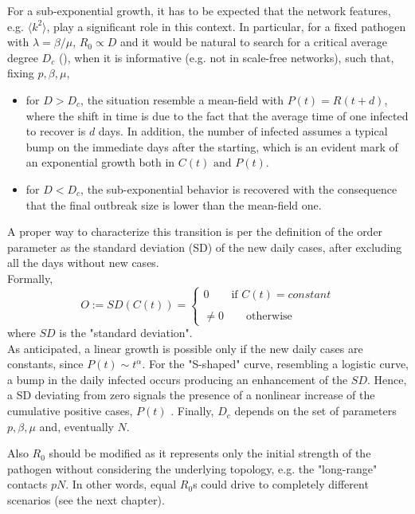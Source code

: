 \documentclass[a4paper,10pt,twoside]{book} %
\theoremstyle{definition}
\begin{document}
For a sub-exponential growth, it has to be expected that the network features, e.g. $\langle k^2 \rangle$, play a significant role in this context. In particular, for a fixed pathogen with $\lambda = \beta/ \mu$, $R_0 \propto D$ and it would be natural to search for a critical average degree $D_c$ (\cite{Thurner::NetBasedExpl}), when it is informative (e.g. not in scale-free networks), such that, fixing $p, \beta, \mu$, 
\begin{itemize}
	\item for $D>D_c$, the situation resemble a mean-field with $P(t) = R(t+d)$, where the shift in time is due to the fact that the average time of one infected to recover is $d$ days. In addition, the number of infected assumes a typical bump on the immediate days after the starting, which is an evident mark of an exponential growth both in $C(t) \text{ and } P(t)$.
	\item for $D<D_c$, the sub-exponential behavior is recovered with the consequence that the final outbreak size is lower than the mean-field one.
\end{itemize}
A proper way to characterize this transition is per the definition of the order parameter \cite{Thurner::NetBasedExpl} as the standard deviation (SD) of the new daily cases, after excluding all the days without new cases.
\\Formally,
\begin{equation}
	O := SD(C(t)) = 
	\begin{cases}
		0 \qquad \text{if $C(t) = constant$}\\\\
		\neq 0 \qquad \text{otherwise} 
	\end{cases}
\end{equation}
where $SD$ is the "standard deviation".
\\As anticipated, a linear growth is possible only if the new daily cases are constants, since $P(t) \sim t^{\alpha}$. For the "S-shaped" curve, resembling a logistic curve, a bump in the daily infected occurs producing an enhancement of the $SD$. Hence, a SD deviating from zero signals the presence of a nonlinear increase of the cumulative positive cases, $P(t)$ \cite{Thurner::NetBasedExpl}. Finally, $D_c$ depends on the set of parameters $p, \beta, \mu$ \cite{Thurner::NetBasedExpl} and, eventually $N$.

Also $R_0$ should be modified as it represents only the initial strength of the pathogen without considering the underlying topology, e.g. the "long-range" contacts $pN$. In other words, equal $R_0$s could drive to completely different scenarios (see the next chapter).
\end{document}
